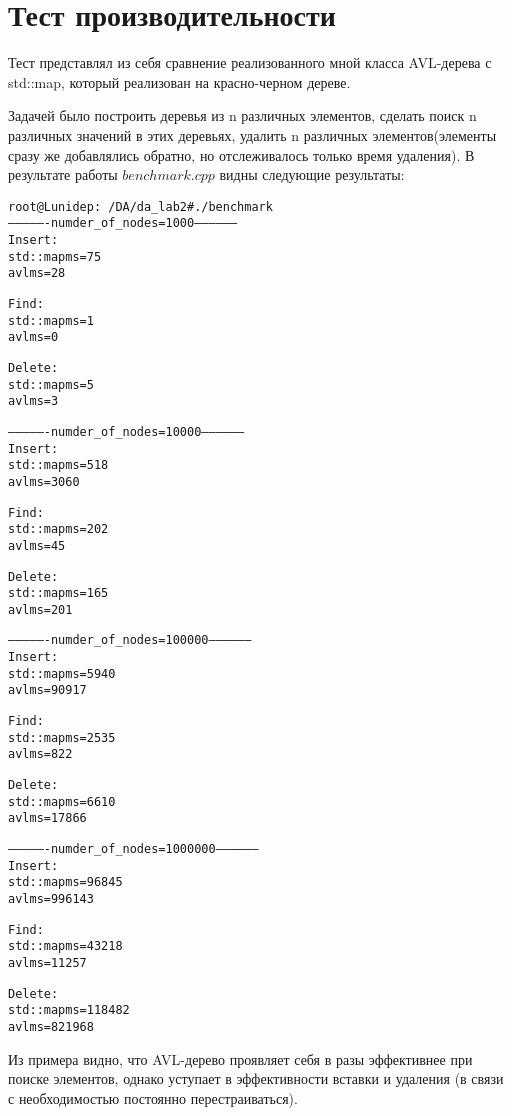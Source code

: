 \section{Тест производительности}

Тест представлял из себя сравнение реализованного мной класса AVL-дерева с std::map, который реализован на красно-черном дереве.\newline

Задачей было построить деревья из n различных элементов, сделать поиск n различных значений в этих деревьях, удалить n различных элементов(элементы сразу же добавлялись обратно, но отслеживалось только время удаления). В результате работы $benchmark.cpp$ видны следующие результаты:

\begin{alltt}
root@Lunidep:~/DA/da_lab2# ./benchmark
----------------numder_of_nodes = 1000 —------------—
Insert:
std::map ms=75
avl ms=28

Find:
std::map ms=1
avl ms=0

Delete:
std::map ms=5
avl ms=3

----------------numder_of_nodes = 10000 —------------—
Insert:
std::map ms=518
avl ms=3060

Find:
std::map ms=202
avl ms=45

Delete:
std::map ms=165
avl ms=201

----------------numder_of_nodes = 100000 —------------—
Insert:
std::map ms=5940
avl ms=90917

Find:
std::map ms=2535
avl ms=822

Delete:
std::map ms=6610
avl ms=17866

----------------numder_of_nodes = 1000000 —------------—
Insert:
std::map ms=96845
avl ms=996143

Find:
std::map ms=43218
avl ms=11257

Delete:
std::map ms=118482
avl ms=821968
\end{alltt}

Из примера видно, что AVL-дерево проявляет себя в разы эффективнее при поиске элементов, однако уступает в эффективности вставки и удаления (в связи с необходимостью постоянно перестраиваться).


\pagebreak

